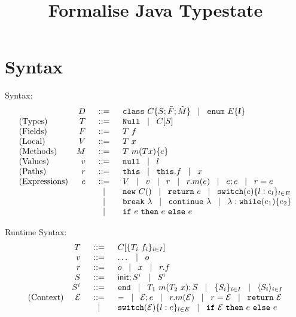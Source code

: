\documentclass[a4paper]{llncs}
\title{Formalise Java Typestate}
\author{}
\newcommand{\class}{\ensuremath{\mathtt{class}}\xspace}
\newcommand{\enum}{\ensuremath{\mathtt{enum}}\xspace}
\newcommand{\Null}{\ensuremath{\mathtt{Null}}\xspace}
\newcommand{\nul}{\ensuremath{\mathtt{null}}\xspace}
\newcommand{\this}{\ensuremath{\mathtt{this}}\xspace}
\newcommand{\brk}[1]{\ensuremath{\mathtt{break}}\ #1}
\newcommand{\continue}[1]{\ensuremath{\mathtt{continue}}\ #1}
\newcommand{\return}[1]{\ensuremath{\mathtt{return}}\ #1}
\newcommand{\ctype}[2]{#1[#2]}
\newcommand{\base}{\ensuremath{\mathtt{base}}\xspace}
\newcommand{\method}[4]{#1\ #2(#3)\set{#4}}
\newcommand{\vdecl}[2]{#1\ #2}
\newcommand{\mcall}[2]{#1(#2)}
\newcommand{\newo}[1]{\ensuremath{\mathtt{new}\ #1()}}
\newcommand{\switch}[2]{\ensuremath{\mathtt{switch}(#1)\set{#2}}}
\newcommand{\while}[2]{\ensuremath{\mathtt{while}(#1)\set{#2}}}
\newcommand{\init}{\mathsf{init};}
\begin{document}
	\maketitle


\section{Syntax}
	Syntax:
\[
	\begin{array}{lrcl}
		&D &\bnfis& \class\ C \set{S; \vect{F}; \vect{M}} \bnfbar \enum\ E \set{\vec{l}}\\
		\textrm{(Types)} & T &\bnfis& \Null \bnfbar \ctype{C}{S}\\%
		\textrm{(Fields)} &F &\bnfis& \vdecl{T}{f}\\		
		\textrm{(Local)} &V &\bnfis& \vdecl{T}{x}\\
		\textrm{(Methods)} &M &\bnfis& \method{T}{m}{T x}{e}\\
		\textrm{(Values)} &v& \bnfis& \nul \bnfbar l\\
		\textrm{(Paths)}  &r& \bnfis & \this \bnfbar \this.f \bnfbar x\\
		\textrm{(Expressions)} &e& \bnfis & V \bnfbar v \bnfbar r \bnfbar r.\mcall{m}{e} \bnfbar e;e \bnfbar r = e\\
		&&\bnfbar & \newo{C} \bnfbar \return{e} \bnfbar \switch{e}{l : e_l}_{l \in E} \\
		&&\bnfbar & \brk{\lambda} \bnfbar \continue \lambda \bnfbar{\lambda}: \while{e_1}{e_2}\\
		&&\bnfbar & \ifthenelse{e}{e}{e}
	\end{array}
\]

	Runtime Syntax:
\[
	\begin{array}{lrcl}
		& T & \bnfis & C[\set{T_i\ f_i}_{i \in I}]\\
		& v & \bnfis & \dots \bnfbar o\\
		& r & \bnfis & o \bnfbar x \bnfbar r.f \\
		& S & \bnfis & \init S^i \bnfbar S^i\\
		& S^i &\bnfis & \tinact \bnfbar T_1\ m(T_2\ x); S \bnfbar \set{S_i}_{i \in I} \bnfbar \lrangle{S_i}_{i \in I}\\
		\textrm{(Context)} & \mathcal{E} &\bnfis& \hole \bnfbar \mathcal{E}; e \bnfbar r.m(\mathcal{E}) \bnfbar r = \mathcal{E}
				\bnfbar \return{\mathcal{E}}\\
				&&\bnfbar& \switch{\mathcal{E}}{l:e}_{l \in E} \bnfbar \ifthenelse{\mathcal{E}}{e}{e}
	\end{array}
\]
\end{document}
